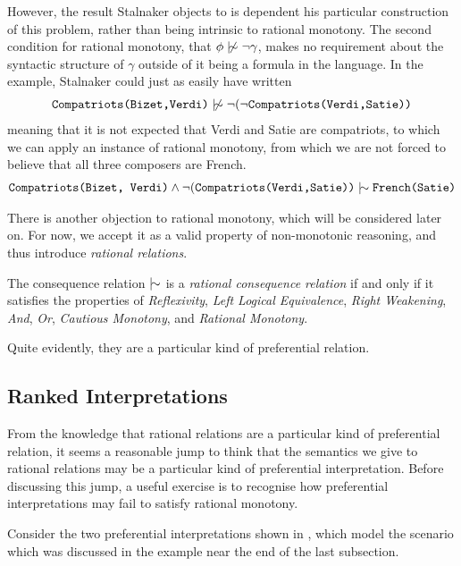 However, the result Stalnaker objects to is dependent his particular construction of this problem, rather than being intrinsic
to rational monotony. The second condition for rational monotony, that $\phi \ntwiddle \neg \gamma$, makes no
requirement about the syntactic structure of $\gamma$ outside of it being a formula in the language. In the example,
Stalnaker could just as easily have written
\begin{align}
	\texttt{Compatriots(Bizet,Verdi)}\ntwiddle \neg (\neg \texttt{Compatriots(Verdi,Satie))}
\end{align}
meaning that it is not expected that Verdi and Satie are compatriots, to which we can apply an instance of rational monotony,
from which we are not forced to believe that all three composers are French.
\begin{align}
	\texttt{Compatriots(Bizet, Verdi)}\land \neg(\texttt{Compatriots(Verdi,Satie))}\twiddle \texttt{French(Satie)}
\end{align}

There is another objection to rational monotony, which will be considered later on. For now, we accept it as a valid property
of non-monotonic reasoning, and thus introduce \textit{rational relations}.
%
\begin{definition}
	\label{definition:rational-relation}

	The consequence relation $\twiddle$ is a \emph{rational consequence relation} if and only if it satisfies the properties
	of \emph{Reflexivity}, \emph{Left Logical Equivalence}, \emph{Right Weakening}, \emph{And}, \emph{Or}, \emph{Cautious
	Monotony}, and \emph{Rational Monotony}.
\end{definition}

Quite evidently, they are a particular kind of preferential relation.

\subsection{Ranked Interpretations}
\label{subsection:ranked-interpretations}

From the knowledge that rational relations are a particular kind of preferential relation, it seems a reasonable jump to
think that the semantics we give to rational relations may be a particular kind of preferential interpretation. Before discussing
this jump, a useful exercise is to recognise how preferential interpretations may fail to satisfy rational monotony.

Consider the two preferential interpretations shown in , which model the scenario which
was discussed in the example near the end of the last subsection.

